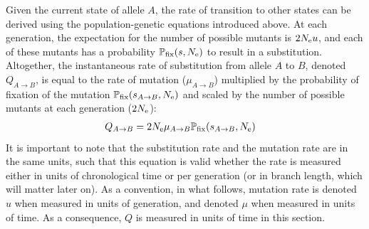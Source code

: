 \begin{table}[H]
    \centering
    \noindent{}
    \caption[Parameters of mutation-selection processes]{Parameter of mutation-selection processes used in this section (\ref{subsec:mutation-limited-assumption})}
    \label{table:params-mutsel}
\end{table}

Given the current state of allele $A$, the rate of transition to other states can be derived using the population-genetic equations introduced above.
At each generation, the expectation for the number of possible mutants is $2N_{\text{e}} u$, and each of these mutants has a probability $\mathbb{P}_{\text{fix}}(s, N_{\text{e}})$ to result in a substitution.
Altogether, the instantaneous rate of substitution from allele $A$ to $B$, denoted $Q_{A \to B}$, is equal to the rate of mutation ($\mu_{A \to B}$) multiplied by the probability of fixation of the mutation $\mathbb{P}_{\text{fix}}(s_{A \to B}, N_{\text{e}})$ and scaled by the number of possible mutants at each generation ($2N_{\text{e}}$):
\begin{align}
    Q_{A \to B} & = 2 N_{\text{e}} \mu_{A \to B}  \mathbb{P}_{\text{fix}}(s_{A \to B}, N_{\text{e}})
\end{align}
It is important to note that the substitution rate and the mutation rate are in the same units, such that this equation is valid whether the rate is measured either in units of chronological time or per generation (or in branch length, which will matter later on).
As a convention, in what follows, mutation rate is denoted $u$ when measured in units of generation, and denoted $\mu$ when measured in units of time.
As a consequence, $Q$ is measured in units of time in this section.

